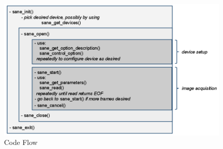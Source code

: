 \documentclass[mingoth,a4paper]{jsarticle}
\begin{document}
\begin{figure}[H]
\begin{center}
 \includegraphics[height=0.5\hsize] {image201012/codeflow.png}
 \caption{Code Flow}
\label{fig:codeflow}
\end{center}
\end{figure}
\end{document}

